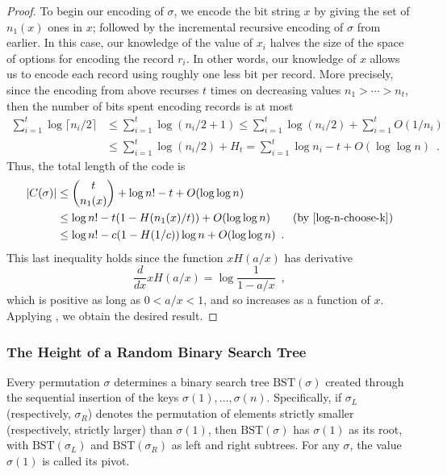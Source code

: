 \documentclass{patmorin}
\begin{document}
\begin{proof}
  To begin our encoding of $\sigma$, we encode the bit string $x$ by
  giving the set of $n_1(x)$ ones in $x$; followed by the incremental
  recursive encoding of $\sigma$ from earlier. In this case, our
  knowledge of the value of $x_i$ halves the size of the space of
  options for encoding the record $r_i$. In other words, our knowledge
  of $x$ allows us to encode each record using roughly one less bit
  per record. More precisely, since the encoding from above recurses
  $t$ times on decreasing values $n_1 > \cdots > n_t$, then the number
  of bits spent encoding records is at most
  \begin{align*}
    \sum_{i = 1}^t \log \lceil n_i/2 \rceil &\leq \sum_{i = 1}^t \log (n_i/2 + 1)
                                              \leq \sum_{i = 1}^t \log (n_i/2) + \sum_{i = 1}^t O(1/n_i) \\
                                            &\leq \sum_{i = 1}^t \log (n_i/2) + H_t = \sum_{i = 1}^t \log n_i - t + O(\log \log n) \enspace .
  \end{align*}
  Thus, the total length of the code is
  \begin{align*}
    |C(\sigma)| &\leq \binom{t}{n_1(x)} + \log n! - t + O(\log \log n) \\
                &\leq \log n! - t (1 - H(n_1(x)/t)) + O(\log \log n) \tag{by \eqref{log-n-choose-k}}\\
                &\leq \log n! - c (1 - H(1/c))\log n + O(\log \log n) \enspace .
  \end{align*}
  This last inequality holds since the function $x H(a/x)$ has
  derivative
  \[
  \frac{d}{d x} x H(a/x) = \log \frac{1}{1 - a/x} \enspace ,
  \]
  which is positive as long as $0 < a/x < 1$, and so increases as a
  function of $x$. Applying , we obtain the desired
  result.
\end{proof}

\subsubsection{The Height of a Random Binary Search Tree}

Every permutation $\sigma$ determines a binary search tree
$\text{BST}(\sigma)$ created through the sequential insertion of the
keys $\sigma(1), \ldots, \sigma(n)$. Specifically, if $\sigma_L$
(respectively, $\sigma_R$) denotes the permutation of elements
strictly smaller (respectively, strictly larger) than $\sigma(1)$,
then $\text{BST}(\sigma)$ has $\sigma(1)$ as its root, with
$\text{BST}(\sigma_L)$ and $\text{BST}(\sigma_R)$ as left and right
subtrees. For any $\sigma$, the value $\sigma(1)$ is called its pivot.
\end{document}
